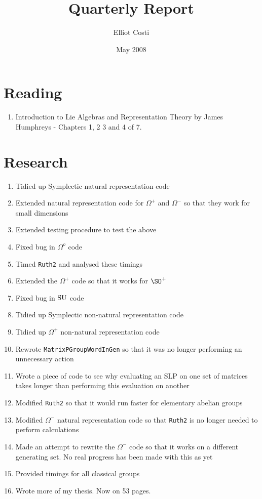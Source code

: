 \documentclass[12pt]{article}
\def\SU{{\rm SU}}
\begin{document}
\title{Quarterly Report}
\author{Elliot Costi}
\date{May 2008}
\maketitle

\newpage

\section{Reading}

\begin{enumerate}
\item Introduction to Lie Algebras and Representation Theory by James Humphreys - Chapters 1, 2 3 and 4 of 7.
\end{enumerate}

\section{Research}

\begin{enumerate}
\item Tidied up Symplectic natural representation code
\item Extended natural representation code for $\Omega^+$ and $\Omega^-$ so that they work for small dimensions
\item Extended testing procedure to test the above
\item Fixed bug in $\Omega^o$ code
\item Timed {\tt Ruth2} and analysed these timings
\item Extended the $\Omega^+$ code so that it works for $\SO^+$
\item Fixed bug in $\SU$ code
\item Tidied up Symplectic non-natural representation code
\item Tidied up $\Omega^+$ non-natural representation code
\item Rewrote {\tt MatrixPGroupWordInGen} so that it was no longer performing an unnecessary action
\item Wrote a piece of code to see why evaluating an SLP on one set of matrices takes longer than performing this evaluation on another
\item Modified {\tt Ruth2} so that it would run faster for elementary abelian groups
\item Modified $\Omega^-$ natural representation code so that {\tt Ruth2} is no longer needed to perform calculations
\item Made an attempt to rewrite the $\Omega^-$ code so that it works on a different generating set. No real progress has been made with this as yet
\item Provided timings for all classical groups
\item Wrote more of my thesis. Now on 53 pages.
\end{enumerate}
\end{document}
